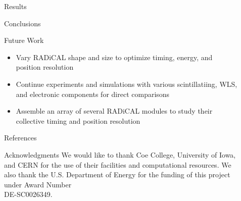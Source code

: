 \documentclass[final]{beamer}
\newlength{\sepwidth}
\newlength{\colwidth}
\newcommand{\separatorcolumn}{\begin{column}{\sepwidth}\end{column}}
\begin{document}
\begin{frame}[t]
\begin{columns}[t]
\separatorcolumn









\begin{column}{\colwidth}

\begin{block}{\Large Results}
  \normalsize

\end{block}

\vspace{-.3cm}
\begin{exampleblock}{\Large Conclusions}
  \normalsize

\end{exampleblock}

\vspace{-.3cm}
\begin{block}{\Large Future Work}
  \normalsize
  \begin{itemize}
    \item Vary RADiCAL shape and size to optimize timing, energy, and position resolution 
    \item Continue experiments and simulations with various scintillatiing, WLS, and electronic components for direct comparisons
    \item Assemble an array of several RADiCAL modules to study their collective timing and position resolution
  \end{itemize}
\end{block}

\vspace{-.3cm}
\begin{block}{\Large References}
  \small
  \nocite{perezlara2024radical}
  \printbibliography[heading=none]
\end{block}

\vspace{-.3cm}
\begin{block}{\Large Acknowledgments}
  \small
  We would like to thank Coe College, University of Iowa, and CERN for the use of their facilities and computational resources. We also thank the U.S. Department of Energy for the funding of this project under Award Number\\DE-SC0026349.
\end{block}

\end{column}

\separatorcolumn
\end{columns}
\end{frame}
\end{document}

